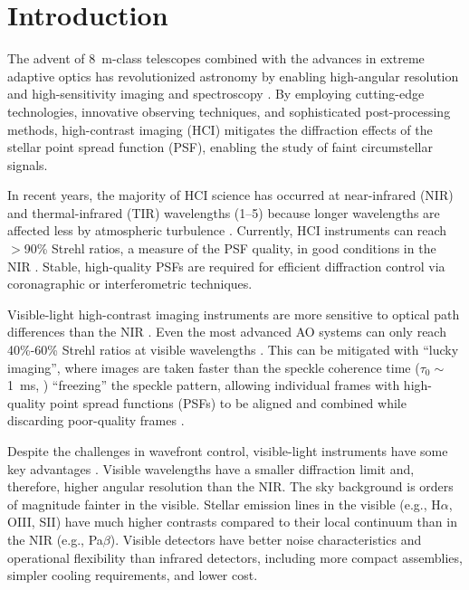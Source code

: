 \section{Introduction}\label{sec:intro}

The advent of \SI{8}{\meter}-class telescopes combined with the advances in extreme adaptive optics has revolutionized astronomy by enabling high-angular resolution and high-sensitivity imaging and spectroscopy \citep{guyon_extreme_2018,currie_direct_2023,galicher_imaging_2024}. By employing cutting-edge technologies, innovative observing techniques, and sophisticated post-processing methods, high-contrast imaging (HCI) mitigates the diffraction effects of the stellar point spread function (PSF), enabling the study of faint circumstellar signals.

In recent years, the majority of HCI science has occurred at near-infrared (NIR) and thermal-infrared (TIR) wavelengths (\SIrange{1}{5}{\micron}) because longer wavelengths are affected less by atmospheric turbulence \citep{fried_optical_1966,roddier_effects_1981}. Currently, HCI instruments can reach $>$90\% Strehl ratios, a measure of the PSF quality, in good conditions in the NIR \citep{beuzit_sphere_2019,lozi_status_2020}. Stable, high-quality PSFs are required for efficient diffraction control via coronagraphic or interferometric techniques.

Visible-light high-contrast imaging instruments are more sensitive to optical path differences than the NIR \citep{fried_optical_1966,roddier_effects_1981}. Even the most advanced AO systems can only reach 40\%-60\% Strehl ratios at visible wavelengths \citep{ahn_scexao_2021,males_magao-x_2022}. This can be mitigated with ``lucky imaging'', where images are taken faster than the speckle coherence time ($\tau_0 \sim$\SI{1}{\milli\second}, \citealp{kooten_climate_2022}) ``freezing'' the speckle pattern, allowing individual frames with high-quality point spread functions (PSFs) to be aligned and combined while discarding poor-quality frames \citep{law_lucky_2006, garrel_highly_2012, lang_tractor_2016}.

Despite the challenges in wavefront control, visible-light instruments have some key advantages \citep{close_into_2014}.  Visible wavelengths have a smaller diffraction limit and, therefore, higher angular resolution than the NIR. The sky background is orders of magnitude fainter in the visible. Stellar emission lines in the visible (e.g., H$\alpha$, OIII, SII) have much higher contrasts compared to their local continuum than in the NIR (e.g., Pa$\beta$). Visible detectors have better noise characteristics and operational flexibility than infrared detectors, including more compact assemblies, simpler cooling requirements, and lower cost.

